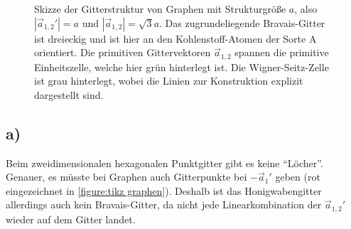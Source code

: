 \documentclass[english, parskip=full]{scrartcl}
\begin{document}
\begin{figure}[!ht]
\caption{Skizze der Gitterstruktur von Graphen mit Strukturgröße $a$, also $|\vec{a}_{1,2}'| = a$ und $|\vec{a}_{1,2}| = \sqrt{3}a$.
Das zugrundeliegende Bravais-Gitter ist dreieckig und ist hier an den Kohlenstoff-Atomen der Sorte A orientiert.
Die primitiven Gittervektoren $\vec{a}_{1,2}$ spannen die primitive Einheitszelle, welche hier grün hinterlegt ist.
Die Wigner-Seitz-Zelle ist grau hinterlegt, wobei die Linien zur Konstruktion explizit dargestellt sind.}
\label{figure:tikz graphen}
\end{figure}

\subsection*{a)}
Beim zweidimensionalen hexagonalen Punktgitter gibt es keine ``Löcher''. 
Genauer, es müsste bei Graphen auch Gitterpunkte bei $-\vec{a}_1'$ geben (rot eingezeichnet in \autoref{figure:tikz graphen}).
Deshalb ist das Honigwabengitter allerdings auch kein Bravais-Gitter, da nicht jede Linearkombination der $\vec{a}_{1,2}'$ wieder auf dem Gitter landet.
\end{document}
